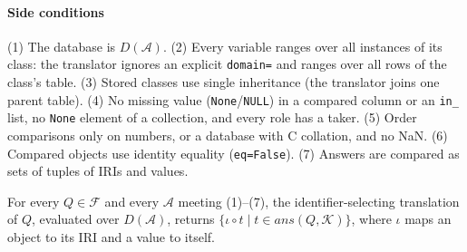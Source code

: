 \paragraph{Side conditions} (1) The database is $D(\mathcal{A})$. (2) Every variable ranges over
all instances of its class: the translator ignores an explicit \texttt{domain=} and ranges over
all rows of the class's table. (3) Stored classes use single inheritance (the translator joins
one parent table). (4) No missing value (\texttt{None}/\texttt{NULL}) in a compared column or an
\texttt{in\_} list, no \texttt{None} element of a collection, and every role has a taker.
(5) Order comparisons only on numbers, or a database with C collation, and no NaN. (6) Compared
objects use identity equality (\texttt{eq=False}). (7) Answers are compared as sets of tuples of
IRIs and values.

\begin{theorem}
For every $Q\in\mathcal{F}$ and every $\mathcal{A}$ meeting (1)--(7), the identifier-selecting
translation of $Q$, evaluated over $D(\mathcal{A})$, returns
$\{\iota\circ t \mid t\in\mathit{ans}(Q,\mathcal{K})\}$, where $\iota$ maps an object to its IRI
and a value to itself.
\end{theorem}

